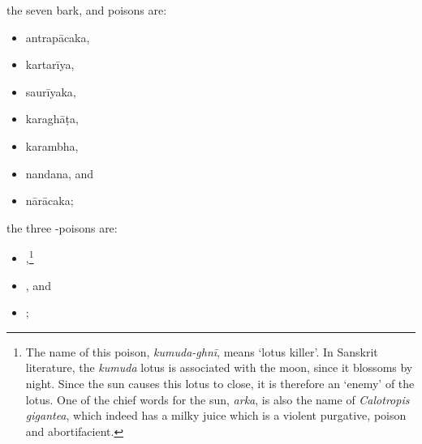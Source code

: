 \begin{translation}
\begin{itemize}
            \end{itemize}
        
        \item
        the seven bark,  and  poisons are:
              \begin{itemize}
            
        \item \gls{antrapācaka},
        \item \gls{kartarīya},
        \item \gls{saurīyaka},
        \item \gls{karaghāṭa},
        \item \gls{karambha},
        \item \gls{nandana},
        and
        \item \gls{nārācaka};
            \end{itemize}
        \item
        the three -poisons are:
              \begin{itemize}
        \item {},\footnote{The name of this poison, \emph{kumuda-ghnī}, means 
            `lotus
        killer'.  In Sanskrit literature, the \emph{kumuda} lotus is associated
        with the moon, since it blossoms by night.  Since the sun causes this lotus
        to close, it is therefore an `enemy' of the lotus.  One of the chief words
        for the sun, \emph{arka}, is also the name of \emph{Calotropis gigantea},
        which indeed has a milky juice which is a violent purgative, poison and
        abortifacient.}
        \item {},
        and
        \item {};
            \end{itemize}
        

\end{translation}
